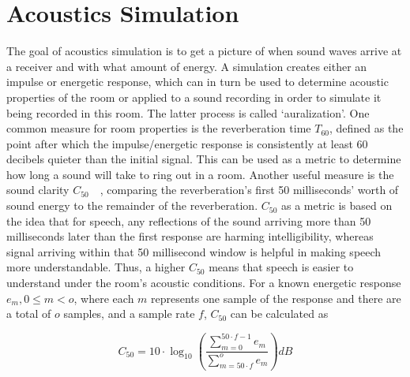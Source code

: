 \section{Acoustics Simulation}\label{sec:FundamentalAcoustics}

The goal of acoustics simulation is to get a picture of when sound waves arrive at a receiver and with what amount of energy.
A simulation creates either an impulse or energetic response,
which can in turn be used to determine acoustic properties of the room
or applied to a sound recording in order to simulate it being recorded in this room.
The latter process is called `auralization'.
\newline
One common measure for room properties is the reverberation time \(T_{60}\),
defined as the point after which the impulse/energetic response is consistently at least 60 decibels quieter than the initial signal.
This can be used as a metric to determine how long a sound will take to ring out in a room.
\newline
Another useful measure is the sound clarity \(C_{50}\)~\cite{AB18}~\cite{PMG22},
comparing the reverberation's first 50 milliseconds' worth of sound energy to the remainder of the reverberation.
\(C_{50}\) as a metric is based on the idea that for speech,
any reflections of the sound arriving more than 50 milliseconds later than the first response are harming intelligibility,
whereas signal arriving within that 50 millisecond window is helpful in making speech more understandable.
Thus, a higher \(C_{50}\) means that speech is easier to understand under the room's acoustic conditions.
\newline
For a known energetic response \(e_m, 0 \le m < o\), where each \(m\) represents one sample of the response and there are a total of \(o\) samples,
and a sample rate \(f\), \(C_{50}\) can be calculated as

\begin{equation}\label{eq:C50}
    C_{50} = 10 \cdot \log_{10} \left( \frac{\displaystyle\sum_{m=0}^{50 \cdot f - 1}e_m}{\displaystyle\sum_{m=50 \cdot f}^{o}e_m} \right) dB
\end{equation}

